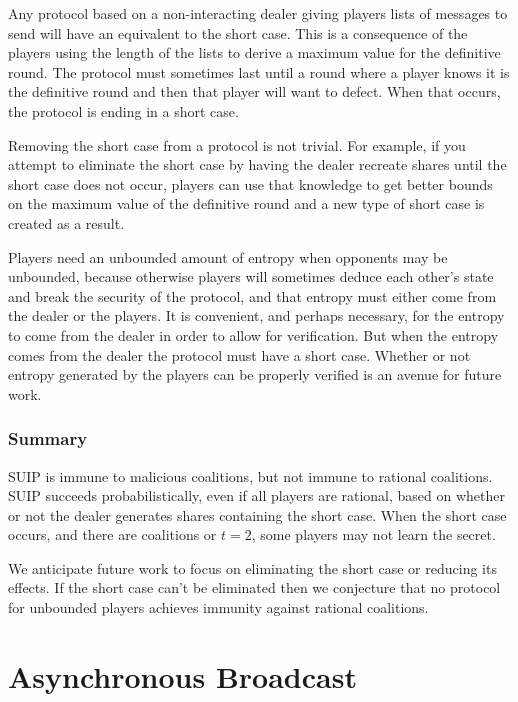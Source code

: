 \documentclass{dalcsthesis}
\begin{document}
Any protocol based on a non-interacting dealer giving players lists of messages to send will have an equivalent to the short case. This is a consequence of the players using the length of the lists to derive a maximum value for the definitive round. The protocol must sometimes last until a round where a player knows it is the definitive round and then that player will want to defect. When that occurs, the protocol is ending in a short case.

Removing the short case from a protocol is not trivial. For example, if you attempt to eliminate the short case by having the dealer recreate shares until the short case does not occur, players can use that knowledge to get better bounds on the maximum value of the definitive round and a new type of short case is created as a result.

Players need an unbounded amount of entropy when opponents may be unbounded, because otherwise players will sometimes deduce each other's state and break the security of the protocol, and that entropy must either come from the dealer or the players. It is convenient, and perhaps necessary, for the entropy to come from the dealer in order to allow for verification. But when the entropy comes from the dealer the protocol must have a short case. Whether or not entropy generated by the players can be properly verified is an avenue for future work.


\subsection{Summary}

SUIP is immune to malicious coalitions, but not immune to rational coalitions. SUIP succeeds probabilistically, even if all players are rational, based on whether or not the dealer generates shares containing the short case. When the short case occurs, and there are coalitions or $t=2$, some players may not learn the secret.

We anticipate future work to focus on eliminating the short case or reducing its effects. If the short case can't be eliminated then we conjecture that no protocol for unbounded players achieves immunity against rational coalitions.





\chapter{Asynchronous Broadcast}
\label{chapter:Asynchronous}
\end{document}

